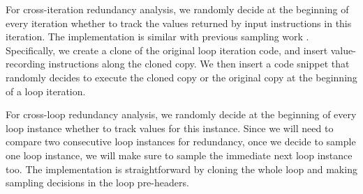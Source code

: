 For cross-iteration redundancy analysis,
we randomly decide at the
beginning of every iteration whether to track the values returned by
input instructions in this iteration.
The implementation is similar with previous sampling work 
\cite{liblit03,liblit05}.
Specifically, we create a clone of the original
loop iteration code, 
and insert value-recording instructions along the
cloned copy. 
We then insert a code snippet that randomly decides to execute the
cloned copy or the original copy at the beginning of a loop iteration. 


For cross-loop redundancy analysis,
we randomly decide at the beginning
of every loop instance whether to track values for this instance. 
Since we will need to compare two consecutive loop
instances for redundancy, once we decide to sample one loop instance, we will
make sure to sample the immediate next loop instance too.
The implementation is straightforward by cloning the whole loop and making
sampling decisions in the loop pre-headers.





